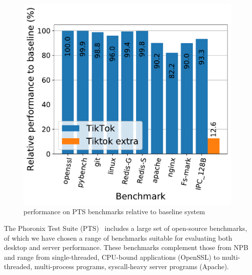 \documentclass[letterpaper,twocolumn,10pt, anonymous]{article}
\begin{document}
\begin{figure}[]
  \includegraphics[width=\linewidth]{img/pts_performance.pdf}
  \caption{\tiktok performance on PTS benchmarks relative to baseline system}
  \label{fig:pts_performance}
\end{figure}

The Phoronix Test Suite (PTS)~\cite{pts} includes a large set of 
open-source benchmarks, of which we have chosen a range of benchmarks 
suitable for evaluating both desktop and server performance.
These benchmarks complement those from NPB and range from single-threaded, 
CPU-bound applications (OpenSSL) to multi-threaded, multi-process 
programs, syscall-heavy server programs (Apache).
\end{document}
